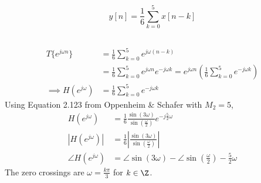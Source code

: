 \documentclass{article}
\begin{document}

\section{}

\begin{equation}
    y[n] = \frac{1}{6} \sum_{k = 0}^5 x[n - k]
\end{equation}

\subsection{}

\begin{align}
    T\{e^{j \omega n}\} &= \frac{1}{6} \sum_{k = 0}^5 e^{j \omega (n - k)} \\
    &= \frac{1}{6} \sum_{k = 0}^5 e^{j \omega n} e^{-j \omega k} = e^{j \omega n} \left(\frac{1}{6} \sum_{k = 0}^5 e^{-j \omega k}\right) \\
    \implies H(e^{j \omega}) &= \frac{1}{6} \sum_{k = 0}^5 e^{-j \omega k}
\end{align}
Using Equation 2.123 from Oppenheim \& Schafer with \(M_2 = 5\),
\begin{align}
    H(e^{j \omega}) &= \frac{1}{6} \frac{\sin(3\omega)}{\sin\left(\frac{\omega}{2}\right)} e^{-j \frac{5}{2} \omega} \\
    |H(e^{j \omega})| &= \frac{1}{6} \left|\frac{\sin(3\omega)}{\sin\left(\frac{\omega}{2}\right)}\right| \\
    \angle H(e^{j \omega}) &= \angle \sin(3 \omega) - \angle \sin\left(\frac{\omega}{2}\right) - \frac{5}{2} \omega
\end{align}
The zero crossings are \(\omega = \frac{k\pi}{3}\) for \(k \in \Z\).
\begin{center}
\end{center}
\end{document}
